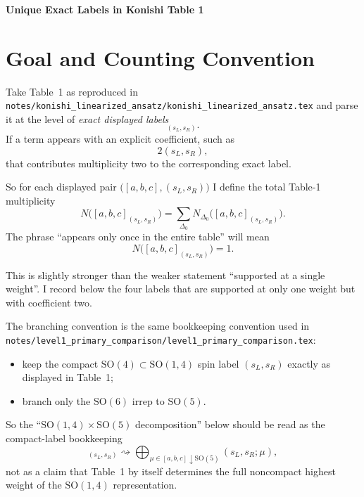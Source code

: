 \documentclass[12pt]{article}
\newcommand{\SO}{\mathrm{SO}}
\newcommand{\D}{\Delta}
\begin{document}
\sloppy

\begin{center}
{\Large\bf Unique Exact Labels in Konishi Table 1}
\end{center}

\section{Goal and Counting Convention}

Take Table~1 as reproduced in
\texttt{notes/konishi\_linearized\_ansatz/konishi\_linearized\_ansatz.tex}
and parse it at the level of \emph{exact displayed labels}
\begin{equation}
[a,b,c]_{(s_L,s_R)}.
\end{equation}
If a term appears with an explicit coefficient, such as
\begin{equation}
2(s_L,s_R),
\end{equation}
that contributes multiplicity two to the corresponding exact label.

So for each displayed pair $\big([a,b,c],(s_L,s_R)\big)$ I define the total Table-1 multiplicity
\begin{equation}
N\big([a,b,c]_{(s_L,s_R)}\big)
=\sum_{\D_0} N_{\D_0}\big([a,b,c]_{(s_L,s_R)}\big).
\end{equation}
The phrase ``appears only once in the entire table'' will mean
\begin{equation}
N\big([a,b,c]_{(s_L,s_R)}\big)=1.
\end{equation}

This is slightly stronger than the weaker statement ``supported at a single weight''.
I record below the four labels that are supported at only one weight but with coefficient two.

The branching convention is the same bookkeeping convention used in
\texttt{notes/level1\_primary\_comparison/level1\_primary\_comparison.tex}:
\begin{itemize}
\item keep the compact $\SO(4)\subset \SO(1,4)$ spin label $(s_L,s_R)$ exactly as displayed in Table~1;
\item branch only the $\SO(6)$ irrep to $\SO(5)$.
\end{itemize}
So the ``$\SO(1,4)\times \SO(5)$ decomposition'' below should be read as the compact-label bookkeeping
\begin{equation}
[a,b,c]_{(s_L,s_R)}
\rightsquigarrow
\bigoplus_{\mu\in [a,b,c]\downarrow \SO(5)} (s_L,s_R;\mu),
\end{equation}
not as a claim that Table~1 by itself determines the full noncompact highest weight of the
$\SO(1,4)$ representation.
\end{document}
